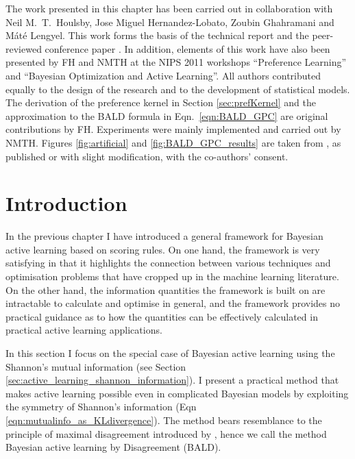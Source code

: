 

\begin{summarycontributions}
The work presented in this chapter has been carried out in collaboration with Neil M.\ T.\ Houlsby, Jose Miguel Hernandez-Lobato, Zoubin Ghahramani and M\'{a}t\'{e} Lengyel. This work forms the basis of the technical report \citep{Houlsby2011} and the peer-reviewed conference paper \citep{Houlsby2012preference}. In addition, elements of this work have also been presented by FH and NMTH at the NIPS 2011 workshops ``Preference Learning'' and ``Bayesian Optimization and Active Learning''. All authors contributed equally to the design of the research and to the development of statistical models. The derivation of the preference kernel in Section \eqref{sec:prefKernel} and the approximation to the BALD formula in Eqn.\ \eqref{eqn:BALD_GPC} are original contributions by FH. Experiments were mainly implemented and carried out by NMTH. Figures \ref{fig:artificial} and \ref{fig:BALD_GPC_results} are taken from \citep{Houlsby2011}, as published or with slight modification, with the co-authors' consent.
\end{summarycontributions}

\section{Introduction}

In the previous chapter I have introduced a general framework for Bayesian active learning based on scoring rules. On one hand, the framework is very satisfying in that it highlights the connection between various techniques and optimisation problems that have cropped up in the machine learning literature. On the other hand, the information quantities the framework is built on are intractable to calculate and optimise in general, and the framework provides no practical guidance as to how the quantities can be effectively calculated in practical active learning applications.

In this section I focus on the special case of Bayesian active learning using the Shannon's mutual information (see Section \ref{sec:active_learning_shannon_information}). I present a practical method that makes active learning possible even in complicated Bayesian models by exploiting the symmetry of Shannon's information (Eqn \eqref{eqn:mutualinfo_as_KLdivergence}). The method bears resemblance to the principle of maximal disagreement introduced by \citet{seung1992}, hence we call the method Bayesian active learning by Disagreement (BALD).

